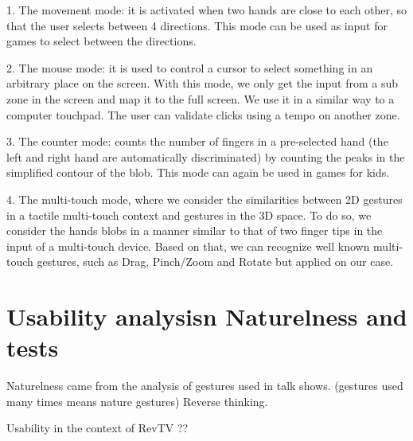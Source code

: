\documentclass{llncs}
\begin{document}
1. The movement mode:
it is activated when two hands are close to each other, so that the user selects between 4 directions. This mode can be used as input for games to select between the directions.

2. The mouse mode:
it is used to control a cursor to select something in an arbitrary place on the screen. With this mode, we only get the input from a sub zone in the screen and map it to the full screen. We use it in a similar way to a computer touchpad.
The user can validate clicks using a tempo on another zone.

3. The counter mode: counts the number of fingers in a pre-selected hand (the left and right hand are automatically discriminated) by counting the peaks in the simplified contour of the blob. This mode can again be used in games for kids.

4. The multi-touch mode, where we consider the similarities between 2D gestures in a tactile multi-touch context and gestures in the 3D space. To do so, we consider the hands blobs in a manner similar to that of two finger tips in the input of a multi-touch device. Based on that, we can recognize well known multi-touch gestures, such as Drag, Pinch/Zoom and Rotate but applied on our case.


\section{Usability analysisn Naturelness and tests}

Naturelness came from the analysis of gestures used in talk shows.
(gestures used many times means nature gestures)
Reverse thinking.

Usability in the context of RevTV ??



\end{document}
